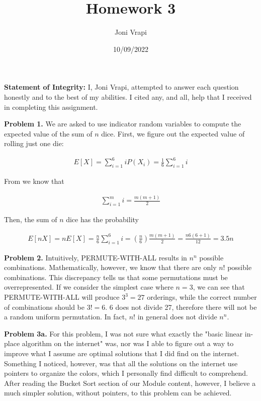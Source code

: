 \documentclass{article}
\title{Homework 3}
\author{Joni Vrapi}
\date{10/09/2022}
\begin{document}
\maketitle

\textbf{Statement of Integrity:} I, Joni Vrapi, attempted to answer each question honestly and to the best of my abilities. I cited any, and all, help that I received in completing this assignment.

\hfill

\textbf{Problem 1.} We are asked to use indicator random variables to compute the expected value \cite{website:1} of the sum of $n$ dice. First, we figure out the expected value of rolling just one die:

\begin{gather}
    E[X] = \sum_{i = 1}^{6}iP(X_i) = \frac{1}{6}\sum_{i = 1}^{6}i 
\end{gather}

From \cite{website:2} we know that

\begin{gather}
    \sum_{i = 1}^{m}i = \frac{m(m+1)}{2}
\end{gather}

Then, the sum of $n$ dice has the probability

\begin{gather}
    E[nX] = nE[X] = \frac{n}{6}\sum_{i = 1}^{6}i = (\frac{n}{6})\frac{m(m+1)}{2} = \frac{n6(6+1)}{12} = 3.5n
\end{gather}

\hfill

\textbf{Problem 2.} Intuitively, PERMUTE-WITH-ALL results in $n^n$ possible combinations. Mathematically, however, we know that there are only $n!$ possible combinations. This discrepancy tells us that some permutations must be overrepresented. If we consider the simplest case where $n = 3$, we can see that PERMUTE-WITH-ALL will produce $3^3 = 27$ orderings, while the correct number of combinations should be $3! = 6$. 6 does not divide 27, therefore there will not be a random uniform permutation. In fact, $n!$ in general does not divide $n^n$.

\hfill

\textbf{Problem 3a.} For this problem, I was not sure what exactly the "basic linear in-place algorithm on the internet" was, nor was I able to figure out a way to improve what I assume are optimal solutions that I did find on the internet. Something I noticed, however, was that all the solutions on the internet use pointers to organize the colors, which I personally find difficult to comprehend. After reading the Bucket Sort section of our Module content, however, I believe a much simpler solution, without pointers, to this problem can be achieved. 
\end{document}
